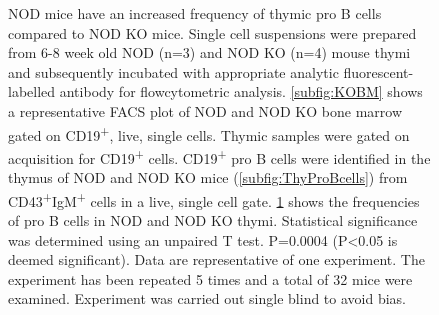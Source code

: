 \begin{figure}
\begin{subfigure}{\textwidth}
	\label{subfig:MatureBincproBgraph}
	\end{subfigure}
\caption[NOD mice have an increased frequency of thymic pro B cells compared to NOD KO mice]{NOD mice have an increased frequency of thymic pro B cells compared to NOD KO mice.
Single cell suspensions were prepared from 6-8 week old NOD (n=3) and NOD KO (n=4) mouse thymi and subsequently incubated with appropriate analytic fluorescent-labelled antibody for flowcytometric analysis.
\ref{subfig:KOBM} shows a representative FACS plot of NOD and NOD KO bone marrow gated on CD19\textsuperscript{+}, live, single cells.
Thymic samples were gated on acquisition for CD19\textsuperscript{+} cells.
CD19\textsuperscript{+} pro B cells were identified in the thymus of NOD and NOD KO mice (\ref{subfig:ThyProBcells}) from CD43\textsuperscript{+}IgM\textsuperscript{+} cells in a live, single cell gate.
\ref{subfig:MatureBincproBgraph} shows the frequencies of pro B cells in NOD and NOD KO thymi.
Statistical significance was determined using an unpaired T test. P=0.0004 (P<0.05 is deemed significant).
Data are representative of one experiment. The experiment has been repeated 5 times and a total of 32 mice were examined.
Experiment was carried out single blind to avoid bias.}
\label{fig:MatureBincProB}
\end{figure}




